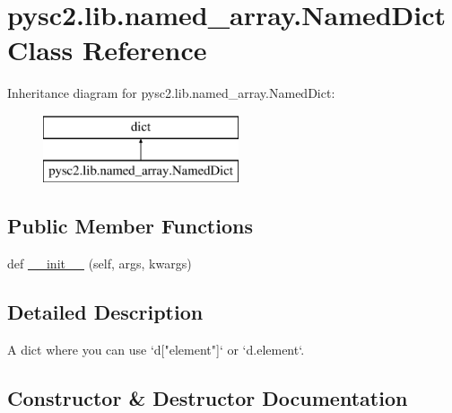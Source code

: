 \hypertarget{classpysc2_1_1lib_1_1named__array_1_1_named_dict}{}\section{pysc2.\+lib.\+named\+\_\+array.\+Named\+Dict Class Reference}
\label{classpysc2_1_1lib_1_1named__array_1_1_named_dict}
Inheritance diagram for pysc2.\+lib.\+named\+\_\+array.\+Named\+Dict\+:\begin{figure}[H]
\begin{center}
\leavevmode
\includegraphics[height=2.000000cm]{classpysc2_1_1lib_1_1named__array_1_1_named_dict}
\end{center}
\end{figure}
\subsection*{Public Member Functions}
\begin{DoxyCompactItemize}
\item 
def \mbox{\hyperlink{classpysc2_1_1lib_1_1named__array_1_1_named_dict_adb11fc53cf4d37dee68b3d68aee852e5}{\+\_\+\+\_\+init\+\_\+\+\_\+}} (self, args, kwargs)
\end{DoxyCompactItemize}


\subsection{Detailed Description}
\begin{DoxyVerb}A dict where you can use `d["element"]` or `d.element`.\end{DoxyVerb}
 

\subsection{Constructor \& Destructor Documentation}
\mbox{\label{classpysc2_1_1lib_1_1named__array_1_1_named_dict_adb11fc53cf4d37dee68b3d68aee852e5}} 
